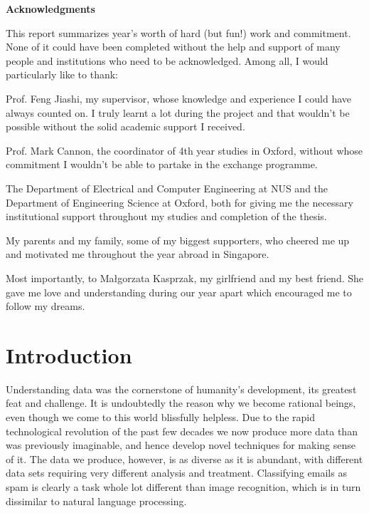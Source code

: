 \documentclass[a4paper, 12pt]{article}
\numberwithin{equation}{section}
\begin{document}
	\newpage
	
	\begin{center}
		\textbf{Acknowledgments}
	\end{center}

    This report summarizes year's worth of hard (but fun!) work and commitment. None of it could have been completed without the help and support of many people and institutions who need to be acknowledged. Among all, I would particularly like to thank:
    
    Prof. Feng Jiashi, my supervisor, whose knowledge and experience I could have always counted on. I truly learnt a lot during the project and that wouldn't be possible without the solid academic support I received.
    
    Prof. Mark Cannon, the coordinator of 4th year studies in Oxford, without whose commitment I wouldn't be able to partake in the exchange programme.
    
    The Department of Electrical and Computer Engineering at NUS and the Department of Engineering Science at Oxford, both for giving me the necessary institutional support throughout my studies and completion of the thesis.
    
    My parents and my family, some of my biggest supporters, who cheered me up and motivated me throughout the year abroad in Singapore.
    
    Most importantly, to Małgorzata Kasprzak, my girlfriend and my best friend. She gave me love and understanding during our year apart which encouraged me to follow my dreams.
	
	\newpage
	
	\tableofcontents 
	
	\newpage
	
	\listoffigures
	
	\newpage
	
	\listoftables
	
	\newpage
	
	
	
	\clearpage
	
	
	\newpage
	
	\clearpage
	
	\pagestyle{wojciech}
	
	\section{Introduction}
	
	Understanding data was the cornerstone of humanity's development, its greatest feat and challenge. It is undoubtedly the reason why we become rational beings, even though we come to this world blissfully helpless. Due to the rapid technological revolution of the past few decades we now produce more data than was previously imaginable, and hence develop novel techniques for making sense of it. The data we produce, however, is as diverse as it is abundant, with different data sets requiring very different analysis and treatment. Classifying emails as spam is clearly a task whole lot different than image recognition, which is in turn dissimilar to natural language processing.
	
\end{document}
